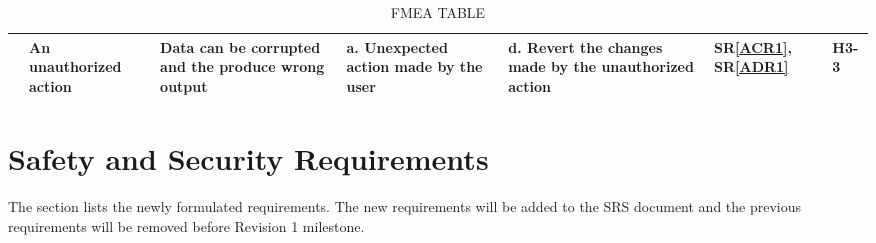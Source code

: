 \documentclass{article}
\begin{document}
\begin{landscape}
\begin{table}[H]
{\begin{tabular}{|p{1.8 in}|p{2.0 in}|p{2 in}|p{2 in}|p{2.3 in}|p{0.5 in}|p{0.5 in}|}
& An unauthorized action
& Data can be corrupted and the produce wrong output 
&
a. Unexpected action made by the user\newline
& 
d. Revert the changes made by the unauthorized action\newline
& SR\ref{ACR1}, SR\ref{ADR1}
& H3-3 \\ \hline



 

\end{tabular}
}
\caption{FMEA TABLE}
\label{Table:FMEA TABLE}
\end{table}
\end{landscape}


\section{Safety and Security Requirements}
The section lists the newly formulated requirements. The new requirements will be added to the SRS document and the previous requirements will be removed before Revision 1 milestone.
\end{document}
